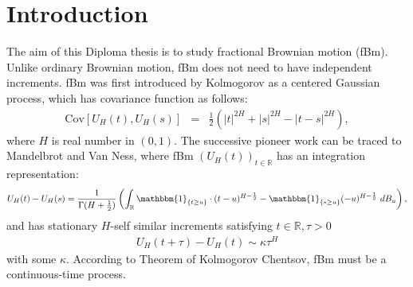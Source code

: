 \documentclass[a4paper, twoside, 11pt]{article}
\theoremstyle{definition}
\newcommand{\brkt}[1]{\left({#1} \right)}
\begin{document}
\section{Introduction}
The aim of this Diploma thesis is to study fractional Brownian motion (fBm). Unlike ordinary Brownian motion, fBm does not need to have independent increments. fBm was first introduced by Kolmogorov\cite{kolm} as a centered Gaussian process, which has covariance function as follows:
\begin{eqnarray*}
  \mathrm{Cov}[U_H(t), U_H(s)] &=& \frac{1}{2} (|t|^{2H} + |s|^{2H} - |t-s|^{2H}),
\end{eqnarray*}
where $H$ is real number in $(0, 1)$. The successive pioneer work can be traced to Mandelbrot and Van Ness\cite{mandelbrot}, where fBm $(U_H(t))_{t\in \mathbb{R}}$ has an integration representation:
\begin{eqnarray*}
 	U_H(t) - U_H(s) = \frac{1}{\Gamma(H+\frac{1}{2})}\brkt{\int_{\mathbb{R}} \mathbbm{1}_{\{t\ge u\}}\cdot (t-u)^{H-\frac{1}{2}} - \mathbbm{1}_{\{s\ge u\}} (-u)^{H-\frac{1}{2}} \, \mathop{dB_u}},
	\label{sec:int}
\end{eqnarray*}
and has stationary $H$-self similar increments satisfying  $t\in \mathbb{R}, \tau > 0$
\begin{eqnarray*}
  U_H(t+\tau) - U_H(t) \sim \kappa \tau^{H} 
  \label{sec:int1}
\end{eqnarray*}
with some $\kappa$. According to Theorem of Kolmogorov Chentsov, fBm must be a continuous-time process.\\
\end{document}
